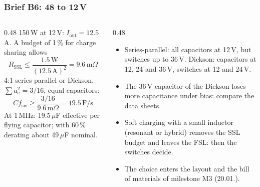 \begin{frame}
	\frametitle{Brief B6: 48 to 12\,V}
	\begin{columns}[T]
		\begin{column}{0.48\textwidth}
			\small
			150\,W at 12\,V: $I_\mathrm{out}=12.5$\,A. A budget of 1\,\% for charge sharing allows
			\begin{equation*}
				R_\mathrm{SSL}\leq\frac{1.5\,\mathrm{W}}{(12.5\,\mathrm{A})^2}=9.6\,\mathrm{m}\Omega
			\end{equation*}
			4:1 series-parallel or Dickson, $\sum a_\mathrm{c}^2=3/16$, equal capacitors:
			\begin{equation*}
				Cf_\mathrm{sw}\geq\frac{3/16}{9.6\,\mathrm{m}\Omega}=19.5\,\mathrm{F/s}
			\end{equation*}
			At 1\,MHz: 19.5\,$\mu$F effective per flying capacitor; with 60\,\% derating about 49\,$\mu$F nominal.
		\end{column}
		\begin{column}{0.48\textwidth}
			\small
			\begin{itemize}
				\item Series-parallel: all capacitors at 12\,V, but switches up to 36\,V. Dickson: capacitors at 12, 24 and 36\,V, switches at 12 and 24\,V.
				\item The 36\,V capacitor of the Dickson loses more capacitance under bias: compare the data sheets.
				\item Soft charging with a small inductor (resonant or hybrid) removes the SSL budget and leaves the FSL: then the switches decide.
				\item The choice enters the layout and the bill of materials of milestone M3 (20.01.).
			\end{itemize}
		\end{column}
	\end{columns}
\end{frame}

